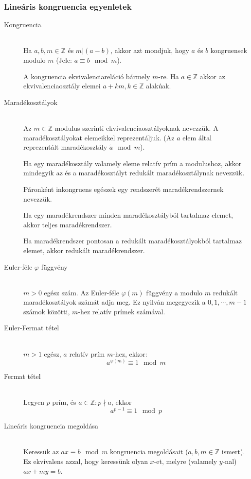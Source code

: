 \documentclass[margin=0px]{article}
\newcommand{\Z}{\mathbb{Z}}
\begin{document}
\subsubsection{Lineáris kongruencia egyenletek}
\begin{description}
    \item[Kongruencia] \hfill \\
        Ha $a,b,m \in\Z$ és $m|(a-b)$, akkor azt mondjuk, hogy $a$ és $b$ kongruensek modulo $m$ (Jele: ${a \equiv b \mod{m}}$).

        A kongruencia ekvivalenciareláció bármely $m$-re. Ha $a\in\Z$ akkor az ekvivalenciaosztály elemei $a+km, k\in\Z$ alakúak.
    \item[Maradékosztályok] \hfill \\
        Az $m\in\Z$ modulus szerinti ekvivalenciaosztályoknak nevezzük. A maradékosztályokat elemeikkel reprezentáljuk. (Az $a$ elem által reprezentált maradékosztály $\widetilde{a} \mod{m}$).

        Ha egy maradékosztály valamely eleme relatív prím a modulushoz, akkor mindegyik az és a maradékosztályt redukált maradékosztálynak nevezzük.

        Páronként inkongruens egészek egy rendszerét maradékrendszernek nevezzük.

        Ha egy maradékrendszer minden maradékosztályból tartalmaz elemet, akkor teljes maradékrendszer.

        Ha maradékrendszer pontosan a redukált maradékosztályokból tartalmaz elemet, akkor redukált maradékrendszer.
    \item[Euler-féle $\varphi$ függvény] \hfill \\
        $m > 0$ egész szám. Az Euler-féle $\varphi(m)$ függvény a modulo $m$ redukált maradékosztályok számát adja meg. Ez nyilván megegyezik a $0,1,\cdots,m-1$ számok közötti, $m$-hez relatív prímek számával.
    \item[Euler-Fermat tétel] \hfill \\
        $m>1$ egész, $a$ relatív prím $m$-hez, ekkor:
        \[a^{\varphi(m)}\equiv 1 \mod{m}\]
    \item[Fermat tétel] \hfill \\
        Legyen $p$ prím, és $a\in\Z: p\nmid a$, ekkor
        \[a^{p-1}\equiv 1 \mod p \]
    \item[Lineáris kongruencia megoldása] \hfill \\
        Keressük az $ax \equiv b \mod{m}$ kongruencia megoldásait ($a,b,m\in\Z$ ismert). Ez ekvivalens azzal, hogy keressünk olyan $x$-et, melyre (valamely $y$-nal) $ax+my = b$.


\end{description}
\end{document}
